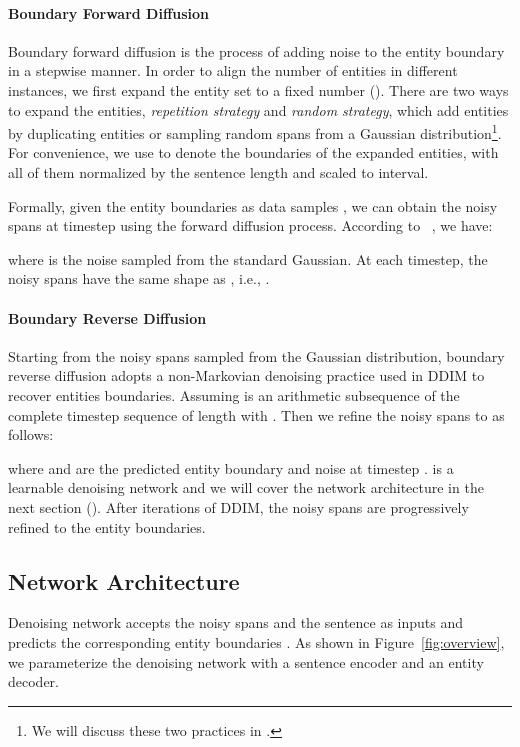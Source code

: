 \documentclass[11pt]{article}
\begin{document}
\paragraph{Boundary Forward Diffusion} 

Boundary forward diffusion is the process of adding noise to the entity boundary in a stepwise manner.
In order to align the number of entities in different instances, we first expand the entity set to a fixed number  ().
There are two ways to expand the entities, \textit{repetition strategy} and \textit{random strategy}, which add  entities by duplicating entities or sampling random spans from a Gaussian distribution\footnote{\;We will discuss these two practices in .}.
For convenience, we use  to denote the boundaries of the  expanded entities, with all of them normalized by the sentence length  and scaled to  interval.


 Formally, given the entity boundaries as data samples , we can obtain the noisy spans at timestep  using the forward diffusion process. According to ~, we have:


\noindent where  is the noise sampled from the standard Gaussian. At each timestep, the noisy spans have the same shape as , i.e., .



\paragraph{Boundary Reverse Diffusion}
Starting from the noisy spans  sampled from the Gaussian distribution, boundary reverse diffusion adopts a non-Markovian denoising practice used in DDIM \citep{song2021denoising} to recover entities boundaries. Assuming  is an arithmetic subsequence of the complete timestep sequence  of length  with . Then we refine the noisy spans  to  as follows:

\noindent where  and  are the predicted entity boundary and noise at timestep .  is a learnable denoising network and we will cover the network architecture in the next section (). After  iterations of DDIM, the noisy spans are progressively refined to the entity boundaries.


\subsection{Network Architecture}
\label{sec:3.3}
Denoising network  accepts the noisy spans  and the sentence  as inputs and predicts the corresponding entity boundaries . As shown in Figure~\ref{fig:overview}, we parameterize the denoising network with a sentence encoder and an entity decoder.
\end{document}
